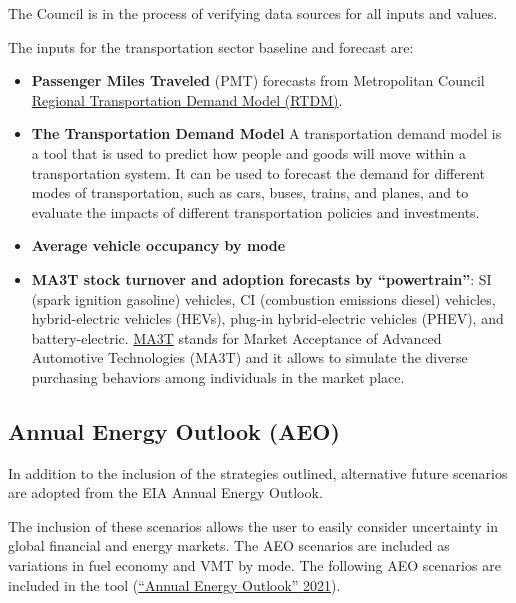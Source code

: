 \documentclass[
]{book}
\providecommand{\tightlist}{%
  \setlength{\itemsep}{0pt}\setlength{\parskip}{0pt}}
\begin{document}
The Council is in the process of verifying data sources for all inputs and values.

The inputs for the transportation sector baseline and forecast are:

\begin{itemize}
\tightlist
\item
  \textbf{Passenger Miles Traveled} (PMT) forecasts from Metropolitan Council \href{https://metrocouncil.org/Transportation/Performance/Travel-Forecasting.aspx}{Regional Transportation Demand Model (RTDM)}.
\item
  \textbf{The Transportation Demand Model} A transportation demand model is a tool that is used to predict how people and goods will move within a transportation system. It can be used to forecast the demand for different modes of transportation, such as cars, buses, trains, and planes, and to evaluate the impacts of different transportation policies and investments.
\item
  \textbf{Average vehicle occupancy by mode}
\item
  \textbf{MA3T stock turnover and adoption forecasts by ``powertrain''}: SI (spark ignition gasoline) vehicles, CI (combustion emissions diesel) vehicles, hybrid-electric vehicles (HEVs), plug-in hybrid-electric vehicles (PHEV), and battery-electric. \href{https://teem.ornl.gov/ma3t.shtml}{MA3T} stands for Market Acceptance of Advanced Automotive Technologies (MA3T) and it allows to simulate the diverse purchasing behaviors among individuals in the market place.
\end{itemize}

\hypertarget{annual-energy-outlook-aeo}{%
\subsection{Annual Energy Outlook (AEO)}\label{annual-energy-outlook-aeo}}

In addition to the inclusion of the strategies outlined, alternative future scenarios are adopted from the EIA Annual Energy Outlook.

The inclusion of these scenarios allows the user to easily consider uncertainty in global financial and energy markets. The AEO scenarios are included as variations in fuel economy and VMT by mode. The following AEO scenarios are included in the tool (\protect\hyperlink{ref-eiaAnnualEnergyOutlook2021}{{``Annual {Energy Outlook}''} 2021}).
\end{document}
